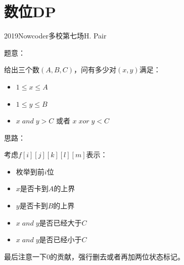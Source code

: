 \section{数位DP}
2019Nowcoder多校第七场H. Pair\par

题意：\par
给出三个数$(A, B, C)$，问有多少对$(x, y)$满足：\par
\begin{itemize}
\item $1 \leq x \leq A$
\item $1 \leq y \leq B$
\item $x\;and\;y > C$ 或者 $x \; xor \; y < C$
\end{itemize} \par


思路：\par
考虑$f[i][j][k][l][m]$表示：
\begin{itemize}
\item 枚举到前$i$位
\item $x$是否卡到$A$的上界
\item $y$是否卡到$B$的上界
\item $x \; and \; y$是否已经大于$C$
\item $x \; and \; y$是否已经小于$C$
\end{itemize} \par
最后注意一下$0$的贡献，强行删去或者再加两位状态标记。\par

